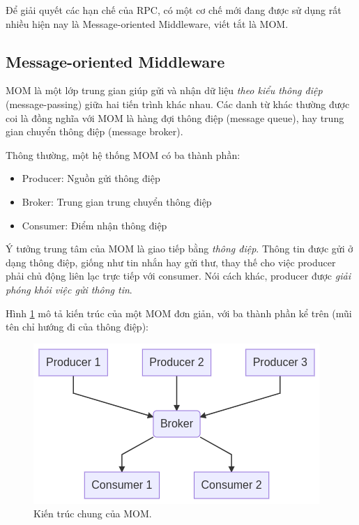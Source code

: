 \documentclass{article}
\begin{document}
Để giải quyết các hạn chế của RPC, có một cơ chế mới đang được sử dụng rất nhiều
hiện nay là Message-oriented Middleware, viết tắt là MOM.

\subsection{Message-oriented Middleware}

MOM là một lớp trung gian giúp gửi và nhận dữ liệu \emph{theo kiểu thông điệp}
(message-passing) giữa hai tiến trình khác nhau. Các danh từ khác thường được
coi là đồng nghĩa với MOM là hàng đợi thông điệp (message queue), hay trung gian
chuyển thông điệp (message broker).

Thông thường, một hệ thống MOM có ba thành phần:

\begin{itemize}
    \item Producer: Nguồn gửi thông điệp
    \item Broker: Trung gian trung chuyển thông điệp
    \item Consumer: Điểm nhận thông điệp
\end{itemize}

Ý tưởng trung tâm của MOM là giao tiếp bằng \emph{thông điệp}. Thông tin được
gửi ở dạng thông điệp, giống như tin nhắn hay gửi thư, thay thế cho việc
producer phải chủ động liên lạc trực tiếp với consumer. Nói cách khác, producer
được \emph{giải phóng khỏi việc gửi thông tin}.

Hình \ref{general_producer_broker_consumer} mô tả kiến trúc của một MOM đơn
giản, với ba thành phần kể trên (mũi tên chỉ hướng đi của thông điệp):



\begin{figure}[H]
    \includegraphics[scale=0.5]{general_producer_broker_consumer.png}
    \centering
    \caption{Kiến trúc chung của MOM.}
    \label{general_producer_broker_consumer}
\end{figure}
\end{document}
